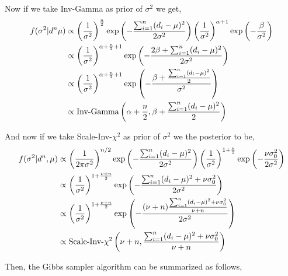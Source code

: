 \begin{example}
    Now if we take Inv-Gamma as prior of $ \sigma^{2} $ we get,
    \begin{align*}
        f(\sigma^{2}|d^{n} \mu) &\propto \left(\frac{ 1 }{\sigma^{2}}\right)^{\frac{ n }{2}} \exp \left( - \frac{ \sum_{i=1}^{n} (d_i - \mu)^{2} }{ 2 \sigma^{2} } \right) 
        \left( \frac{ 1 }{ \sigma^{2} }\right)^{\alpha+1}  \exp \left( - \frac{ \beta }{ \sigma^{2}  } \right) \\ 
                                &\propto \left( \frac{ 1 }{ \sigma^{2} } \right)^{\alpha + \frac{ n }{ 2 } + 1} 
                                \exp \left( - \frac{ 2\beta + \sum_{i=1}^{n} (d_i-\mu)^{2} }{ 2\sigma^{2} } \right) \\ 
                                &\propto \left( \frac{ 1 }{ \sigma^{2} } \right)^{\alpha + \frac{ n }{ 2 } + 1}
                                \exp \left( - \frac{ \beta + \frac{ \sum_{i=1}^{n} (d_i-\mu)^{2} }{ 2 } }{ \sigma^{2} } \right) \\ 
                                &\propto \text{Inv-Gamma}\left( \alpha + \frac{ n }{ 2 }, \beta + \frac{ \sum_{i=1}^{n} (d_i-\mu)^{2} }{ 2 } \right)
    \end{align*}

    And now if we take Scale-Inv-$ \chi^{2} $ as prior of $ \sigma^{2} $ we the posterior to be,
    \begin{align*}
        f(\sigma^{2}|d^{n} ,\mu) &\propto \left( \frac{ 1 }{ 2 \pi \sigma^{2} } \right)^{n/2} 
        \exp \left( - \frac{ \sum_{i=1}^{n} (d_i - \mu)^{2} }{ 2 \sigma^{2} } \right) 
        \left( \frac{ 1 }{ \sigma^{2} } \right)^{1+\frac{ \nu }{ 2 }}
        \exp \left( - \frac{ \nu \sigma_0^{2} }{ 2 \sigma^{2} } \right) \\ 
                                 &\propto \left( \frac{ 1 }{ \sigma^{2} } \right)^{1+\frac{ \nu+ n }{ 2 }} 
        \exp \left( - \frac{ \sum_{i=1}^{n}(d_i-\mu)^{2} + \nu \sigma_0^{2}  }{ 2 \sigma^{2} } \right) \\ 
                                 &\propto \left( \frac{ 1 }{ \sigma^{2} } \right)^{1+\frac{ \nu+ n }{ 2 }} 
                                 \exp \left( - \frac{ (\nu + n) \frac{ \sum_{i=1}^{n}(d_i-\mu)^{2} + \nu \sigma_0^{2} }{ \nu + n } }{ 2 \sigma^{2} } \right) \\ 
                                 &\propto \text{Scale-Inv-}\chi^{2}\left( \nu + n, \frac{ \sum_{i=1}^{n}(d_i-\mu)^{2} + \nu \sigma_0^{2} }{ \nu + n } \right)
    \end{align*}
    
    Then, the Gibbs sampler algorithm can be summarized as follows,


\end{example}
